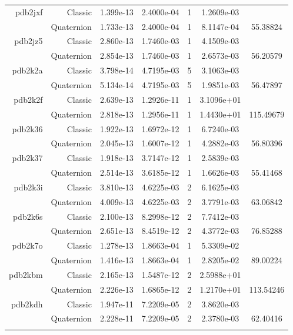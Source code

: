 \begin{xltabular}{\textwidth}{r|rS[table-format=1.3e+2]S[table-format=1.4e+2]cS[table-format=1.4e+2]S[table-format=-1.5]}
pdb2jxf & Classic & 1.399e-13 & 2.4000e-04 & 1 & 1.2609e-03 & \\
& Quaternion & 1.733e-13 & 2.4000e-04 & 1 & 8.1147e-04 & 55.38824\\  \addlinespace
pdb2jz5 & Classic & 2.860e-13 & 1.7460e-03 & 1 & 4.1509e-03 & \\
& Quaternion & 2.854e-13 & 1.7460e-03 & 1 & 2.6573e-03 & 56.20579\\  \addlinespace
pdb2k2a & Classic & 3.798e-14 & 4.7195e-03 & 5 & 3.1063e-03 & \\
& Quaternion & 5.134e-14 & 4.7195e-03 & 5 & 1.9851e-03 & 56.47897\\  \addlinespace
pdb2k2f & Classic & 2.639e-13 & 1.2926e-11 & 1 & 3.1096e+01 & \\
& Quaternion & 2.818e-13 & 1.2956e-11 & 1 & 1.4430e+01 & 115.49679\\  \addlinespace
pdb2k36 & Classic & 1.922e-13 & 1.6972e-12 & 1 & 6.7240e-03 & \\
& Quaternion & 2.045e-13 & 1.6007e-12 & 1 & 4.2882e-03 & 56.80396\\  \addlinespace
pdb2k37 & Classic & 1.918e-13 & 3.7147e-12 & 1 & 2.5839e-03 & \\
& Quaternion & 2.514e-13 & 3.6185e-12 & 1 & 1.6626e-03 & 55.41468\\  \addlinespace
pdb2k3i & Classic & 3.810e-13 & 4.6225e-03 & 2 & 6.1625e-03 & \\
& Quaternion & 4.009e-13 & 4.6225e-03 & 2 & 3.7791e-03 & 63.06842\\  \addlinespace
pdb2k6s & Classic & 2.100e-13 & 8.2998e-12 & 2 & 7.7412e-03 & \\
& Quaternion & 2.651e-13 & 8.4519e-12 & 2 & 4.3772e-03 & 76.85288\\  \addlinespace
pdb2k7o & Classic & 1.278e-13 & 1.8663e-04 & 1 & 5.3309e-02 & \\
& Quaternion & 1.416e-13 & 1.8663e-04 & 1 & 2.8205e-02 & 89.00224\\  \addlinespace
pdb2kbm & Classic & 2.165e-13 & 1.5487e-12 & 2 & 2.5988e+01 & \\
& Quaternion & 2.226e-13 & 1.6865e-12 & 2 & 1.2170e+01 & 113.54246\\  \addlinespace
pdb2kdh & Classic & 1.947e-11 & 7.2209e-05 & 2 & 3.8620e-03 & \\
& Quaternion & 2.228e-11 & 7.2209e-05 & 2 & 2.3780e-03 & 62.40416\\  \addlinespace

\end{xltabular}
